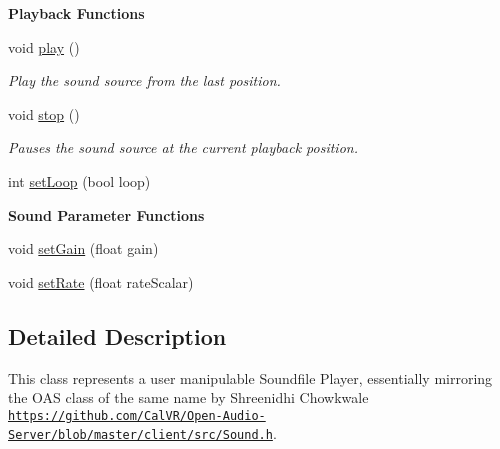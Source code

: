 \begin{Indent}{\bf Playback Functions}\par
\begin{DoxyCompactItemize}
\item 
\hypertarget{classsc_1_1Sound_a491c7b5026a733fa09df9b3ce38b32ba}{void \hyperlink{classsc_1_1Sound_a491c7b5026a733fa09df9b3ce38b32ba}{play} ()}\label{classsc_1_1Sound_a491c7b5026a733fa09df9b3ce38b32ba}

\begin{DoxyCompactList}\small\item\em Play the sound source from the last position. \end{DoxyCompactList}\item 
\hypertarget{classsc_1_1Sound_aaf5d0d8f2c5089445e0175ee415cdf0c}{void \hyperlink{classsc_1_1Sound_aaf5d0d8f2c5089445e0175ee415cdf0c}{stop} ()}\label{classsc_1_1Sound_aaf5d0d8f2c5089445e0175ee415cdf0c}

\begin{DoxyCompactList}\small\item\em Pauses the sound source at the current playback position. \end{DoxyCompactList}\item 
int \hyperlink{classsc_1_1Sound_a943faed99ce5d92f889aae1a908265c7}{set\-Loop} (bool loop)
\end{DoxyCompactItemize}
\end{Indent}
\begin{Indent}{\bf Sound Parameter Functions}\par
\begin{DoxyCompactItemize}
\item 
void \hyperlink{classsc_1_1Sound_a443df566abe97dcf23a879a971310d23}{set\-Gain} (float gain)
\item 
void \hyperlink{classsc_1_1Sound_a358d46a4cfd52b885bcb1cbd1715893c}{set\-Rate} (float rate\-Scalar)
\end{DoxyCompactItemize}
\end{Indent}


\subsection{Detailed Description}
This class represents a user manipulable Soundfile Player, essentially mirroring the O\-A\-S class of the same name by Shreenidhi Chowkwale  \href{https://github.com/CalVR/Open-Audio-Server/blob/master/client/src/Sound.h}{\tt https\-://github.\-com/\-Cal\-V\-R/\-Open-\/\-Audio-\/\-Server/blob/master/client/src/\-Sound.\-h}. 

